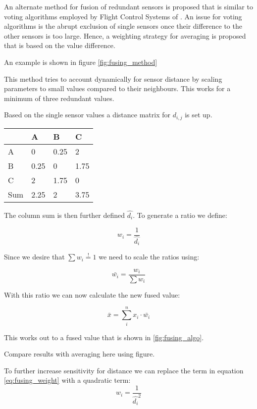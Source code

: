 
An alternate method for fusion of redundant sensors is proposed that is similar to voting algorithms employed by Flight Control Systems of \cite{tischler_advances_2018}. An issue for voting algorithms is the abrupt exclusion of single sensors once their difference to the other sensors is too large. Hence, a weighting strategy for averaging is proposed that is based on the value difference.

An example is shown in figure \ref{fig:fusing_method}

This method tries to account dynamically for sensor distance by scaling parameters to small values compared to their neighbours. This works for a minimum of three redundant values.

Based on the single sensor values a distance matrix for $d_{i,j}$ is set up.

\begin{table}[]
    \begin{tabular}{@{}llll@{}}
        \toprule                 & A    & B    & C    \\ \midrule
        \multicolumn{1}{l|}{A}   & 0    & 0.25 & 2    \\
        \multicolumn{1}{l|}{B}   & 0.25 & 0    & 1.75 \\
        \multicolumn{1}{l|}{C}   & 2    & 1.75 & 0    \\ \midrule
        \multicolumn{1}{l|}{Sum} & 2.25 & 2    & 3.75 \\ \bottomrule
    \end{tabular}
\end{table}

The column sum is then further defined $\hat{d_{i}}$. To generate a ratio we define:

\begin{equation}
    w_i=\frac{1}{\hat{d_i}}
    \label{eq:fusing_weight}
\end{equation}

Since we desire that
$\sum{w_i}\overset{!}{=}1$ we need to scale the ratios using:

\begin{equation}
    \bar{w_{i}} = \frac{w_i}{\sum{w_i}}
\end{equation}


With this ratio we can now calculate the new fused value:

\begin{equation}
    \bar{x} = \sum_{i}^{n} x_i \cdot \bar{w_{i}}
\end{equation}

This works out to a fused value that is shown in \ref{fig:fusing_algo}.

Compare results with averaging here using figure.

To further increase sensitivity for distance we can replace the term in equation \ref{eq:fusing_weight} with a quadratic term:
\begin{equation}
    w_i=\frac{1}{\hat{d_i}^2}
\end{equation}